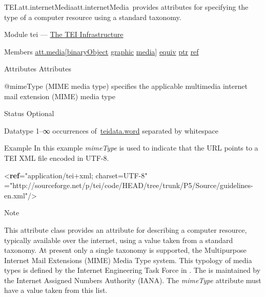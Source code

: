 \begin{reflist}
\item[]\begin{specHead}{TEI.att.internetMedia}{att.internetMedia} provides attributes for specifying the type of a computer resource using a standard taxonomy.\end{specHead} 
    \item[{Module}]
  tei — \hyperref[ST]{The TEI Infrastructure}
    \item[{Members}]
  \hyperref[TEI.att.media]{att.media}[\hyperref[TEI.binaryObject]{binaryObject} \hyperref[TEI.graphic]{graphic} \hyperref[TEI.media]{media}] \hyperref[TEI.equiv]{equiv} \hyperref[TEI.ptr]{ptr} \hyperref[TEI.ref]{ref}
    \item[{Attributes}]
  Attributes\hfil\\[-10pt]\begin{sansreflist}
    \item[@mimeType]
  (MIME media type) specifies the applicable multimedia internet mail extension (MIME) media type
\begin{reflist}
    \item[{Status}]
  Optional
    \item[{Datatype}]
  1–∞ occurrences of \hyperref[TEI.teidata.word]{teidata.word} separated by whitespace
\end{reflist}  
\end{sansreflist}  
    \item[{Example}]
  In this example {\itshape mimeType} is used to indicate that the URL points to a TEI XML file encoded in UTF-8.\leavevmode\bgroup{}\exampleFont \begin{shaded}\noindent\mbox{}{<\textbf{ref}\hspace*{1em}{mimeType}="{application/tei+xml; charset=UTF-8}"\mbox{}\newline 
\hspace*{1em}{target}="{http://sourceforge.net/p/tei/code/HEAD/tree/trunk/P5/Source/guidelines-en.xml}"/>}\end{shaded}\egroup 


    \item[{Note}]
  \par
This attribute class provides an attribute for describing a computer resource, typically available over the internet, using a value taken from a standard taxonomy. At present only a single taxonomy is supported, the Multipurpose Internet Mail Extensions (MIME) Media Type system. This typology of media types is defined by the Internet Engineering Task Force in . The  is maintained by the Internet Assigned Numbers Authority (IANA). The {\itshape mimeType} attribute must have a value taken from this list.
\end{reflist}  
